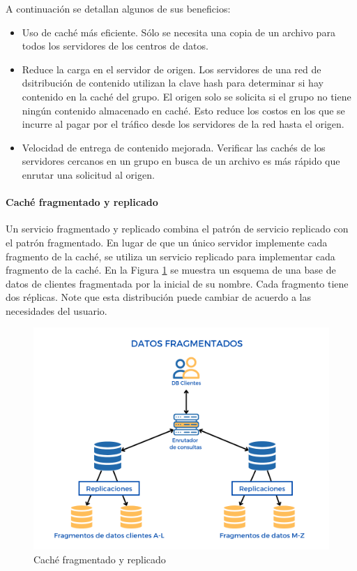     A continuación se detallan algunos de sus beneficios:
    
    \begin{itemize}
    	\item  Uso de caché más eficiente. Sólo se necesita una copia de un archivo para todos los servidores de los centros de datos. 
    	\item Reduce la carga en el servidor de origen. Los servidores de una red de dsitribuci\'on de contenido utilizan la clave hash para determinar si hay contenido en la caché del grupo. El origen solo se solicita si el grupo no tiene ningún contenido almacenado en caché. Esto reduce los costos en los que se incurre al pagar por el tráfico desde los servidores de la red hasta el origen. 
    	\item Velocidad de entrega de contenido mejorada. Verificar las cachés de los servidores cercanos en un grupo en busca de un archivo es más rápido que enrutar una solicitud al origen. 
    	
    \end{itemize}
    
    \paragraph{Caché fragmentado y replicado}
    Un servicio fragmentado y replicado combina el patrón de servicio replicado  con el patrón fragmentado. En  lugar de que un único servidor implemente cada fragmento de la caché, se utiliza un servicio replicado para implementar cada fragmento de la caché. En la Figura \ref{fig:cache-frag-rep} se muestra un esquema de una base de datos de clientes fragmentada  por la inicial de su nombre. Cada fragmento tiene dos r\'eplicas. Note que esta distribuci\'on puede cambiar  de  acuerdo a las necesidades del usuario.
    
     
    \begin{figure}%
     	\includegraphics {9/8.png} 
    	\caption{Caché fragmentado y replicado }
    	\label{fig:cache-frag-rep}
    \end{figure}
   

